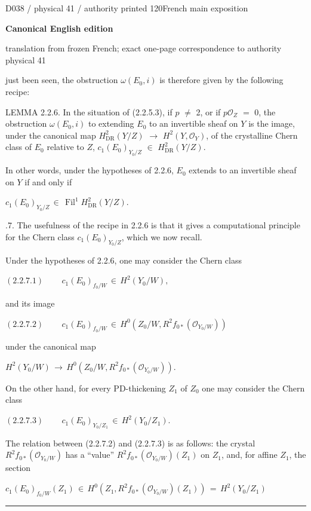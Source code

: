\documentclass[9pt]{article}
\newcommand{\CanonText}[1]{\par{\fontsize{8.0}{9.35}\selectfont\RaggedRight #1\par}\vspace{2.2pt}}
\newcommand{\CanonDisplay}[1]{\par\vspace{1.2pt}\begin{center}{\fontsize{7.2}{8.4}\selectfont\(\displaystyle #1\)}\end{center}\vspace{1.2pt}}
\newcommand{\LayerTitle}{Canonical English edition}
\begin{document}
\noindent\begin{minipage}[t][\dimexpr\textheight-5pt\relax][t]{\textwidth}
{\sffamily\fontsize{7.3}{8.2}\selectfont\color{Quiet} D038 / physical 41 / authority printed 120\hfill French main exposition}
\par{}\vspace{4.5pt}
{\sffamily\fontsize{10.4}{11.6}\selectfont\bfseries\color{Accent} \LayerTitle}
\par{\sffamily\fontsize{6.7}{7.7}\selectfont\color{Quiet} translation from frozen French; exact one-page correspondence to authority physical 41}
\vspace{5pt}
\CanonText{just been seen, the obstruction \(\omega{}(E_{0},i)\) is therefore given by the following recipe:}
\CanonText{LEMMA 2.2.6. In the situation of (2.2.5.3), if \(p\) \(\neq{}\) 2, or if \(p\mathcal{O}_{Z}\) \(=\) 0, the obstruction \(\omega{}(E_{0},i)\) to extending \(E_{0}\) to an invertible sheaf on \(Y\) is the image, under the canonical map \(H^{2}_{\mathrm{DR}}(Y/Z)\) \(\to{}\) \(H^{2}(Y,\mathcal{O}_{Y})\), of the crystalline Chern class of \(E_{0}\) relative to \(Z\), \(c_{1}(E_{0})_{Y_{0}/Z}\) \(\in{}\) \(H^{2}_{\mathrm{DR}}(Y/Z)\).}
\CanonText{In other words, under the hypotheses of 2.2.6, \(E_{0}\) extends to an invertible sheaf on \(Y\) if and only if}
\CanonDisplay{c_{1}(E_{0})_{Y_{0}/Z}\,\in{}\,\operatorname{Fil}^{1}H^{2}_{\mathrm{DR}}(Y/Z).}
\CanonText{2.2.7. The usefulness of the recipe in 2.2.6 is that it gives a computational principle for the Chern class \(c_{1}(E_{0})_{Y_{0}/Z}\), which we now recall.}
\CanonText{Under the hypotheses of 2.2.6, one may consider the Chern class}
\CanonDisplay{(2.2.7.1)\qquad\,c_{1}(E_{0})_{f_{0}/W}\,\in{}\,H^{2}(Y_{0}/W),}
\CanonText{and its image}
\CanonDisplay{(2.2.7.2)\qquad\,c_{1}(E_{0})_{f_{0}/W}\,\in{}\,H^{0}(Z_{0}/W,R^{2}f_{0*}(\mathcal{O}_{Y_{0}/W}))}
\CanonText{under the canonical map}
\CanonDisplay{H^{2}(Y_{0}/W)\,\to{}\,H^{0}(Z_{0}/W,R^{2}f_{0*}(\mathcal{O}_{Y_{0}/W})).}
\CanonText{On the other hand, for every PD-thickening \(Z_{1}\) of \(Z_{0}\) one may consider the Chern class}
\CanonDisplay{(2.2.7.3)\qquad\,c_{1}(E_{0})_{Y_{0}/Z_{1}}\,\in{}\,H^{2}(Y_{0}/Z_{1}).}
\CanonText{The relation between (2.2.7.2) and (2.2.7.3) is as follows: the crystal \(R^{2}f_{0*}(\mathcal{O}_{Y_{0}/W})\) has a “value” \(R^{2}f_{0*}(\mathcal{O}_{Y_{0}/W})(Z_{1})\) on \(Z_{1}\), and, for affine \(Z_{1}\), the section}
\CanonDisplay{c_{1}(E_{0})_{f_{0}/W}(Z_{1})\,\in{}\,H^{0}(Z_{1},R^{2}f_{0*}(\mathcal{O}_{Y_{0}/W})(Z_{1}))\,=\,H^{2}(Y_{0}/Z_{1})}
\vfill
{\color{Accent}\hrule height 0.35pt}\vspace{3pt}
\end{minipage}
\end{document}
